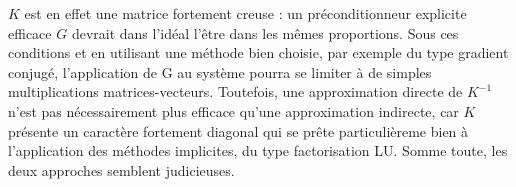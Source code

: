 $K$ est en effet une matrice fortement creuse : un préconditionneur explicite efficace $G$ devrait dans l'idéal l'être dans les mêmes proportions. Sous ces conditions et en utilisant une méthode bien choisie, par exemple du type gradient conjugé, l'application de G au système pourra se limiter à de simples multiplications matrices-vecteurs. Toutefois, une approximation directe de $K^{-1}$ n'est pas nécessairement plus efficace qu'une approximation indirecte, car $K$ présente un caractère fortement diagonal qui se prête particulièreme bien à l'application des méthodes implicites, du type factorisation LU. Somme toute, les deux approches semblent judicieuses.

